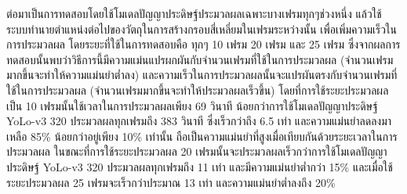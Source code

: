 ต่อมาเป็นการทดสอบโดยใช้โมเดลปัญญาประดิษฐ์ประมวลผลเฉพาะบางเฟรมทุกๆช่วงหนึ่ง แล้วใช้ระบบทำนายตำแหน่งต่อไปของวัตถุในการสร้างกรอบสี่เหลี่ยมในเฟรมระหว่างนั้น เพื่อเพิ่มความเร็วในการประมวลผล 
โดยระยะที่ใช้ในการทดสอบคือ ทุกๆ 10 เฟรม 20 เฟรม และ 25 เฟรม ซึ่งจากผลการทดสอบนั้นพบว่าวิธีการนี้มีความแม่นแปรผกผันกับจำนวนเฟรมที่ใช้ในการประมวลผล (จำนวนเฟรมมากขึ้นจะทำให้ความแม่นยำต่ำลง) 
และความเร็วในการประมวลผลนั้นจะแปรผันตรงกับจำนวนเฟรมที่ใช้ในการประมวลผล (จำนวนเฟรมมากขึ้นจะทำให้ประมวลผลเร็วขึ้น) โดยที่การใช้ระยะประมวลผลเป็น 10 เฟรมนั้นใช้เวลาในการประมวลผลเพียง 69 วินาที 
น้อยกว่าการใช้โมเดลปัญญาประดิษฐ์ YoLo-v3 320 ประมวลผลทุกเฟรมถึง 383 วินาที ซึ่งเร็วกว่าถึง 6.5 เท่า และความแม่นยำลดลงมาเหลือ 85\% น้อยกว่าอยู่เพียง 10\% เท่านั้น ถือเป็นความแม่นยำที่สูงเมื่อเทียบกันด้วยระยะเวลาในการประมวลผล
ในขณะที่การใช้ระยะประมวลผล 20 เฟรมนั้นจะประมวลผลเร็วกว่าการใช้โมเดลปัญญาประดิษฐ์ YoLo-v3 320 ประมวลผลทุกเฟรมถึง 11 เท่า และมีความแม่นยำต่ำกว่า 15\%
และเมื่อใช้ระยะประมวลผล 25 เฟรมจะเร็วกว่าประมาณ 13 เท่า และความแม่นยำต่ำลงถึง 20\% 